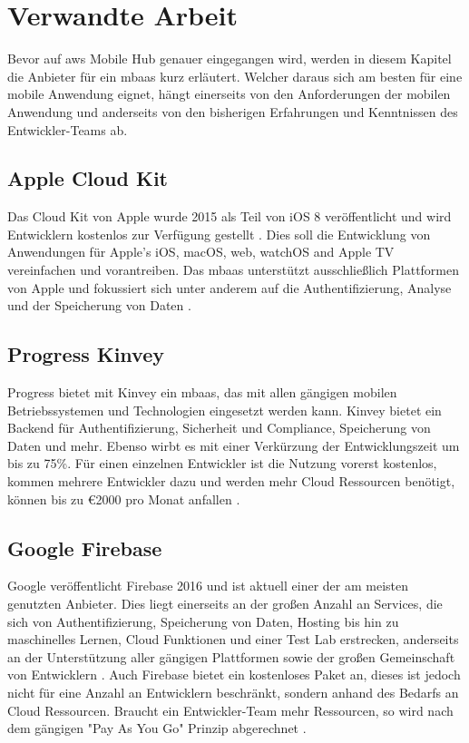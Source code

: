 \section{Verwandte Arbeit}
Bevor auf \gls{aws} Mobile Hub genauer eingegangen wird, werden in diesem Kapitel die Anbieter für ein \gls{mbaas} kurz erläutert. Welcher daraus sich am besten für eine mobile Anwendung eignet, hängt einerseits von den Anforderungen der mobilen Anwendung und anderseits von den bisherigen Erfahrungen und Kenntnissen des Entwickler-Teams ab.

\subsection{Apple Cloud Kit}
Das Cloud Kit von Apple wurde 2015 als Teil von iOS 8 veröffentlicht und wird Entwicklern kostenlos zur Verfügung gestellt \cite{techbeacon}. Dies soll die Entwicklung von Anwendungen für Apple's iOS, macOS, web, watchOS and Apple TV vereinfachen und vorantreiben. Das \gls{mbaas} unterstützt ausschließlich Plattformen von Apple und fokussiert sich unter anderem auf die Authentifizierung, Analyse und der Speicherung von Daten \cite{applecloudkit}.

\subsection{Progress Kinvey}
Progress bietet mit Kinvey ein \gls{mbaas}, das mit allen gängigen mobilen Betriebssystemen und Technologien eingesetzt werden kann. Kinvey bietet ein Backend für Authentifizierung, Sicherheit und Compliance, Speicherung von Daten und mehr. Ebenso wirbt es mit einer Verkürzung der Entwicklungszeit um bis zu 75\%. Für einen einzelnen Entwickler ist die Nutzung vorerst kostenlos, kommen mehrere Entwickler dazu und werden mehr Cloud Ressourcen benötigt, können bis zu \euro{2000} pro Monat anfallen \cite{progresskinvey}.

\subsection{Google Firebase}
Google veröffentlicht Firebase 2016 und ist aktuell einer der am meisten genutzten Anbieter. Dies liegt einerseits an der großen Anzahl an Services, die sich von Authentifizierung, Speicherung von Daten, Hosting bis hin zu maschinelles Lernen, Cloud Funktionen und einer Test Lab erstrecken, anderseits an der Unterstützung aller gängigen Plattformen sowie der großen Gemeinschaft von Entwicklern \cite{techbeacon}. Auch Firebase bietet ein kostenloses Paket an, dieses ist jedoch nicht für eine Anzahl an Entwicklern beschränkt, sondern anhand des Bedarfs an Cloud Ressourcen. Braucht ein Entwickler-Team mehr Ressourcen, so wird nach dem gängigen "Pay As You Go" Prinzip abgerechnet \cite{googlefirebase}.


